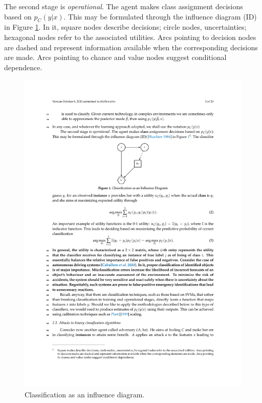 The second stage is {\em operational}.
The agent makes class assignment decisions based on $p_C (y |x)$. %
This may be formulated through the influence diagram (ID)
\parencite{evaluatingInfluenceDiagrams1986} in Figure \ref{fig:classification}. {In it, square nodes describe decisions; circle nodes, uncertainties; hexagonal nodes refer to the associated utilities. Arcs pointing to decision nodes are dashed and represent information available when the corresponding decisions are made. Arcs pointing to chance and value nodes suggest conditional dependence.}%
\begin{figure}[H]
\centering
\includegraphics[scale=1]{figures/1.pdf}
\caption{Classification as an influence diagram.} \label{fig:classification}
\end{figure}
